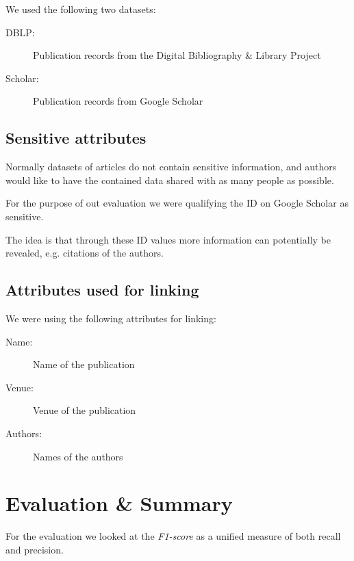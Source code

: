\documentclass[sigconf,nonacm]{acmart}
\begin{document}
We used the following two datasets:
\begin{description}
\item[DBLP:] Publication records from the Digital Bibliography \& Library Project
\item[Scholar:] Publication records from Google Scholar
\end{description}

\subsection{Sensitive attributes}

Normally datasets of articles do not contain sensitive information,
and authors would like to have the contained data shared with
as many people as possible.

For the purpose of out evaluation we were qualifying the
ID on Google Scholar as sensitive.

The idea is that through these ID values more information
can potentially be revealed, e.g. citations of the authors.

\subsection{Attributes used for linking}

We were using the following attributes for linking:
\begin{description}
\item[Name:] Name of the publication
\item[Venue:] Venue of the publication
\item[Authors:] Names of the authors
\end{description}

\section{Evaluation \& Summary}

For the evaluation we looked at the \emph{F1-score} as a unified
measure of both recall and precision.



\end{document}
